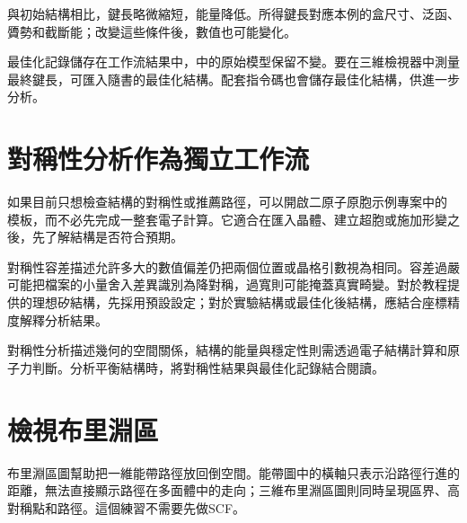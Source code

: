 與初始結構相比，鍵長略微縮短，能量降低。所得鍵長對應本例的盒尺寸、泛函、贗勢和截斷能；改變這些條件後，數值也可能變化。

最佳化記錄儲存在工作流結果中，中的原始模型保留不變。要在三維檢視器中測量最終鍵長，可匯入隨書的最佳化結構。配套指令碼也會儲存最佳化結構，供進一步分析。

\section{對稱性分析作為獨立工作流}

如果目前只想檢查結構的對稱性或推薦路徑，可以開啟二原子原胞示例專案中的  模板，而不必先完成一整套電子計算。它適合在匯入晶體、建立超胞或施加形變之後，先了解結構是否符合預期。

對稱性容差描述允許多大的數值偏差仍把兩個位置或晶格引數視為相同。容差過嚴可能把檔案的小量舍入差異識別為降對稱，過寬則可能掩蓋真實畸變。對於教程提供的理想矽結構，先採用預設設定；對於實驗結構或最佳化後結構，應結合座標精度解釋分析結果。

對稱性分析描述幾何的空間關係，結構的能量與穩定性則需透過電子結構計算和原子力判斷。分析平衡結構時，將對稱性結果與最佳化記錄結合閱讀。

\section{檢視布里淵區}\label{sec:bz-workflow}

布里淵區圖幫助把一維能帶路徑放回倒空間。能帶圖中的橫軸只表示沿路徑行進的距離，無法直接顯示路徑在多面體中的走向；三維布里淵區圖則同時呈現區界、高對稱點和路徑。這個練習不需要先做SCF。



